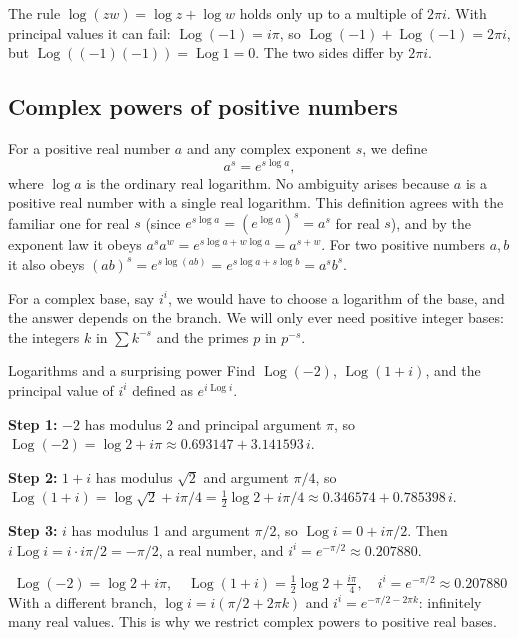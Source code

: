 \begin{pitfall}
The rule $\log(zw)=\log z+\log w$ holds only up to a multiple of $2\pi i$. With principal values it can fail: $\operatorname{Log}(-1)=i\pi$, so $\operatorname{Log}(-1)+\operatorname{Log}(-1)=2\pi i$, but $\operatorname{Log}((-1)(-1))=\operatorname{Log}1=0$. The two sides differ by $2\pi i$.
\end{pitfall}

\subsection{Complex powers of positive numbers}

For a positive real number $a$ and any complex exponent $s$, we define
\begin{equation}
a^{s}=e^{s\log a},\label{eq:complex-power}
\end{equation}
where $\log a$ is the ordinary real logarithm. No ambiguity arises because $a$ is a positive real number with a single real logarithm. This definition agrees with the familiar one for real $s$ (since $e^{s\log a}=(e^{\log a})^s=a^s$ for real $s$), and by the exponent law it obeys $a^{s}a^{w}=e^{s\log a+w\log a}=a^{s+w}$. For two positive numbers $a,b$ it also obeys $(ab)^s=e^{s\log(ab)}=e^{s\log a+s\log b}=a^sb^s$.

For a complex base, say $i^i$, we would have to choose a logarithm of the base, and the answer depends on the branch. We will only ever need positive integer bases: the integers $k$ in $\sum k^{-s}$ and the primes $p$ in $p^{-s}$.

\begin{sample}{Logarithms and a surprising power}
Find $\operatorname{Log}(-2)$, $\operatorname{Log}(1+i)$, and the principal value of $i^i$ defined as $e^{i\operatorname{Log}i}$.

\textbf{Step 1:} $-2$ has modulus 2 and principal argument $\pi$, so $\operatorname{Log}(-2)=\log2+i\pi\approx0.693147+3.141593\,i$.

\textbf{Step 2:} $1+i$ has modulus $\sqrt2$ and argument $\pi/4$, so $\operatorname{Log}(1+i)=\log\sqrt2+i\pi/4=\tfrac12\log2+i\pi/4\approx0.346574+0.785398\,i$.

\textbf{Step 3:} $i$ has modulus 1 and argument $\pi/2$, so $\operatorname{Log}i=0+i\pi/2$. Then $i\operatorname{Log}i=i\cdot i\pi/2=-\pi/2$, a real number, and $i^i=e^{-\pi/2}\approx0.207880$.

\[
\boxed{\operatorname{Log}(-2)=\log2+i\pi,\quad\operatorname{Log}(1+i)=\tfrac12\log2+\tfrac{i\pi}{4},\quad i^i=e^{-\pi/2}\approx0.207880}
\]
With a different branch, $\log i=i(\pi/2+2\pi k)$ and $i^i=e^{-\pi/2-2\pi k}$: infinitely many real values. This is why we restrict complex powers to positive real bases.
\end{sample}

